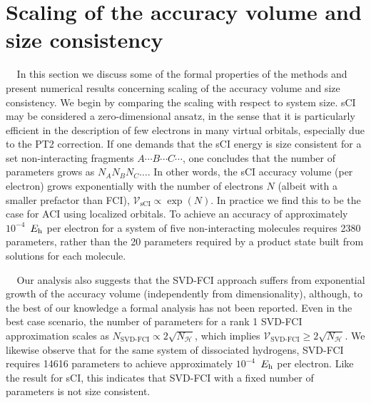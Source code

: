 \documentclass[aip,jcp,amsmath,amssymb, preprint]{revtex4-1}
\newcommand*{\Eh}{$E_{\rm h}$\xspace}
\newcommand{\add}[1]{\colorbox{goodgreen}{\textcolor{white}{\footnotesize  \fontfamily{phv}\selectfont +}}
    \textcolor{goodgreen}{{#1}}\xspace}
\begin{document}
\section{\label{sec:comparison}Scaling of the accuracy volume and size consistency}
\add{
In this section we discuss some of the formal properties of the methods and present numerical results concerning scaling of the accuracy volume and size consistency.
We begin by comparing the scaling with respect to system size.
sCI may be considered a zero-dimensional ansatz, in the sense that it is particularly efficient in the description of few electrons in many virtual orbitals, especially due to the PT2 correction.
If one demands that the sCI energy is size consistent for a set non-interacting fragments $A\cdots B \cdots C\cdots$, one concludes that the number of parameters grows as $N_A N_B N_C \ldots$.
In other words, the sCI accuracy volume (per electron) grows exponentially with the number of electrons $N$ (albeit with a smaller prefactor than FCI), $\mathcal{V}_{\text{sCI}} \propto \exp(N)$.
In practice we find this to be the case for ACI using localized orbitals.
To achieve an accuracy of approximately $10^{-4}$~\Eh per electron for a system of five non-interacting \ce{H2} molecules requires 2380 parameters, rather than the 20 parameters required by a product state built from solutions for each \ce{H2} molecule.
}

\add{Our analysis also suggests that the SVD-FCI approach suffers from exponential growth of the accuracy volume (independently from  dimensionality), although, to the best of our knowledge a formal analysis has not been reported. 
Even in the best case scenario, the number of parameters for a rank 1 SVD-FCI approximation scales as $N_{\text{SVD-FCI}} \propto 2 \sqrt{N_{\mathcal{H}}}$, which implies $\mathcal{V}_{\text{SVD-FCI}} \geq 2 \sqrt{N_{\mathcal{H}}}$.
We likewise observe that for the same system of dissociated hydrogens, SVD-FCI requires 14616 parameters to achieve approximately $10^{-4}$~\Eh per electron.
Like the result for sCI, this indicates that SVD-FCI with a fixed number of parameters is not size consistent.}
\end{document}
